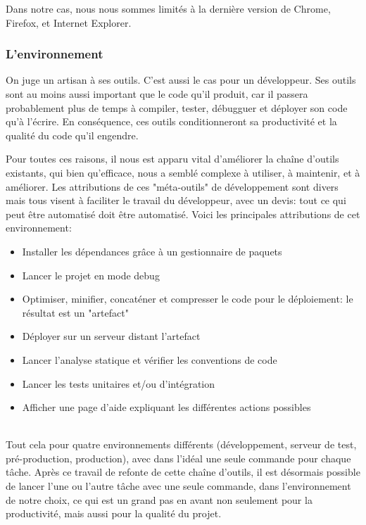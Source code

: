 \documentclass[a4paper,french,12pt]{article}
\begin{document}
	Dans notre cas, nous nous sommes limités à la dernière version de Chrome, Firefox, et Internet Explorer.
	
	\subsubsection{L'environnement}
	
	On juge un artisan à ses outils. C'est aussi le cas pour un développeur. 	Ses outils sont au moins aussi important que le code qu'il produit, car il passera probablement plus de temps à compiler, tester, débugguer et déployer son code qu'à l'écrire. En conséquence, ces outils conditionneront
	sa productivité et la qualité du code qu'il engendre.
	
	Pour toutes ces raisons, il nous est apparu vital d'améliorer la chaîne d'outils existants, qui bien qu'efficace, nous a semblé complexe à utiliser, à maintenir, et à améliorer. Les attributions de ces "méta-outils" de développement sont divers mais tous visent à faciliter le travail du développeur, avec un devis: tout ce qui peut être automatisé doit être automatisé.
	Voici les principales attributions de cet environnement: ~\\
	
	\begin{itemize}
		\item Installer les dépendances grâce à un gestionnaire de paquets
		\item Lancer le projet en mode debug
		\item Optimiser, minifier, concaténer et compresser le code pour le déploiement: le résultat est un "artefact"
		\item Déployer sur un serveur distant l'artefact
		\item Lancer l'analyse statique et vérifier les conventions de code
		\item Lancer les tests unitaires et/ou d'intégration
		\item Afficher une page d'aide expliquant les différentes actions possibles
	\end{itemize}	 ~\\
	
	Tout cela pour quatre environnements différents (développement, serveur de test, pré-production, production), avec dans l'idéal une seule commande pour chaque tâche.
	Après ce travail de refonte de cette chaîne d'outils, il est désormais possible de lancer l'une ou l'autre tâche avec une seule commande, dans l'environnement de notre choix, ce qui est un grand pas en avant non seulement pour la productivité, mais aussi pour la qualité du projet. 
	
\end{document}

